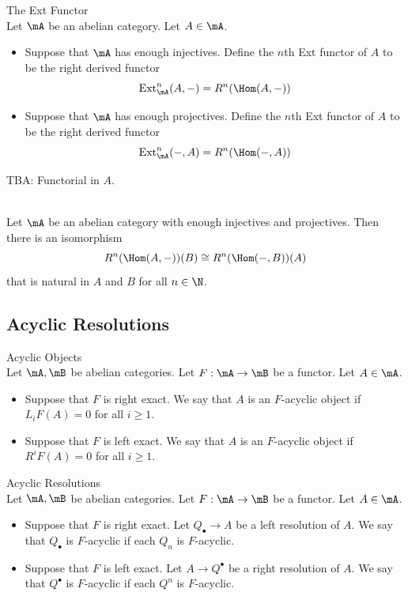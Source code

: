 \documentclass[a4paper]{article}
\begin{document}
\begin{defn}{The Ext Functor}{}\\
Let $\mA$ be an abelian category. Let $A\in\mA$. 
\begin{itemize}
\item Suppose that $\mA$ has enough injectives. Define the $n$th Ext functor of $A$ to be the right derived functor $$\text{Ext}_\mA^n(A,-)=R^n(\Hom(A,-))$$
\item Suppose that $\mA$ has enough projectives. Define the $n$th Ext functor of $A$ to be the right derived functor $$\text{Ext}_\mA^n(-,A)=R^n(\Hom(-,A))$$
\end{itemize}
\end{defn}

TBA: Functorial in $A$. 

\begin{prp}{}{}\\
Let $\mA$ be an abelian category with enough injectives and projectives. Then there is an isomorphism $$R^n(\Hom(A,-))(B)\cong R^n(\Hom(-,B))(A)$$ that is natural in $A$ and $B$ for all $n\in\N$. 
\end{prp}

\subsection{Acyclic Resolutions}
\begin{defn}{Acyclic Objects}{}\\
Let $\mA,\mB$ be abelian categories. Let $F:\mA\to\mB$ be a functor. Let $A\in\mA$. 
\begin{itemize}
\item Suppose that $F$ is right exact. We say that $A$ is an $F$-acyclic object if $L_iF(A)=0$ for all $i\geq 1$. 
\item Suppose that $F$ is left exact. We say that $A$ is an $F$-acyclic object if $R^iF(A)=0$ for all $i\geq 1$. 
\end{itemize}
\end{defn}

\begin{defn}{Acyclic Resolutions}{}\\
Let $\mA,\mB$ be abelian categories. Let $F:\mA\to\mB$ be a functor. Let $A\in\mA$. 
\begin{itemize}
\item Suppose that $F$ is right exact. Let $Q_\bullet\to A$ be a left resolution of $A$. We say that $Q_\bullet$ is $F$-acyclic if each $Q_n$ is $F$-acyclic. 
\item Suppose that $F$ is left exact. Let $A\to Q^\bullet$ be a right resolution of $A$. We say that $Q^\bullet$ is $F$-acyclic if each $Q^n$ is $F$-acyclic. 
\end{itemize}
\end{defn}
\end{document}
